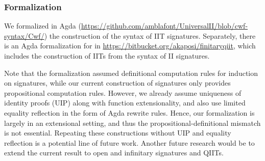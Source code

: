 \subsubsection*{Formalization}
We formalized in Agda
(\url{https://github.com/amblafont/UniversalII/blob/cwf-syntax/Cwf/}) the
construction of the syntax of IIT signatures. Separately, there is an Agda
formalization for \cite{qiit} in
\url{https://bitbucket.org/akaposi/finitaryqiit}, which includes the
construction of IITs from the syntax of II signatures.

Note that the \cite{qiit} formalization assumed definitional computation rules
for induction on signatures, while our current construction of signatures only
provides propositional computation rules. However, we already assume uniqueness
of identity proofs (UIP) along with function extensionality, and also use limited
equality reflection in the form of Agda rewrite rules. Hence, our formalization
is largely in an extensional setting, and thus the propositional-definitional
mismatch is not essential. Repeating these constructions without UIP and equality
reflection is a potential line of future work. Another future research would be to
extend the current result to open and infinitary signatures and QIITs.
